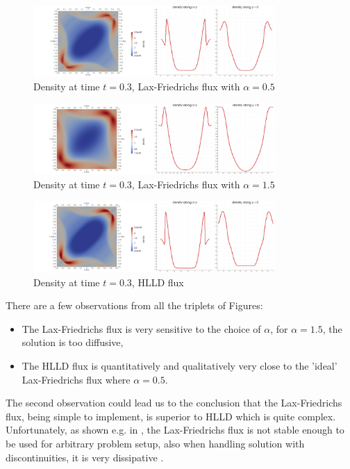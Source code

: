 	
	\begin{figure}[H]
		\begin{center}
			\includegraphics[width=0.82\textwidth]{img/numflux/lf4.jpg}
			\vspace{-3mm}
		\caption{Density at time $t = 0.3$, Lax-Friedrichs flux with $\alpha = 0.5$}
		\end{center}
	\end{figure}\vspace{-5mm}	
	\begin{figure}[H]
		\begin{center}
			\includegraphics[width=0.82\textwidth]{img/numflux/lfw4.jpg}
			\vspace{-3mm}
		\caption{Density at time $t = 0.3$, Lax-Friedrichs flux with $\alpha = 1.5$}
		\end{center}
	\end{figure}\vspace{-5mm}
	\begin{figure}[H]
		\begin{center}
			\includegraphics[width=0.82\textwidth]{img/numflux/hl4.jpg}
			\vspace{-3mm}
		\caption{Density at time $t = 0.3$, HLLD flux}
		\end{center}
	\end{figure}\vspace{-5mm}
There are a few observations from all the triplets of Figures:
\begin{itemize}
\item The Lax-Friedrichs flux is very sensitive to the choice of $\alpha$, for $\alpha = 1.5$, the solution is too diffusive,
\item The HLLD flux is quantitatively and qualitatively very close to the 'ideal' Lax-Friedrichs flux where $\alpha = 0.5$.
\end{itemize}
The second observation could lead us to the conclusion that the Lax-Friedrichs flux, being simple to implement, is superior to HLLD which is quite complex. Unfortunately, as shown e.g. in \cite{lfunstable}, the Lax-Friedrichs flux is not stable enough to be used for arbitrary problem setup, also when handling solution with discontinuities, it is very dissipative \cite{lfdisc}.

